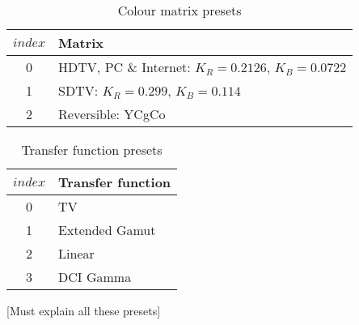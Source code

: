 \begin{table}[!ht]
\centering
\begin{tabular}{|c|l|}
\hline
$index$ &  {\bf Matrix}\\
\hline
0 & HDTV, PC \& Internet: $K_R=0.2126$, $K_B=0.0722$ \\ 
\hline
1 & SDTV: $K_R=0.299$, $K_B=0.114$ \\
\hline
2 & Reversible: YCgCo \\
\hline
\end{tabular}
\caption{Colour matrix presets}\label{matrixvalues}
\end{table}

\begin{table}[!ht]
\centering
\begin{tabular}{|c|l|}
\hline
$index$ & {\bf Transfer function}\\
\hline
0 & TV \\ 
\hline
1 & Extended Gamut \\
\hline
2 & Linear\\
\hline
3 & DCI Gamma\\
\hline
\end{tabular}
\caption{Transfer function presets}\label{transfervalues}
\end{table}

[Must explain all these presets]